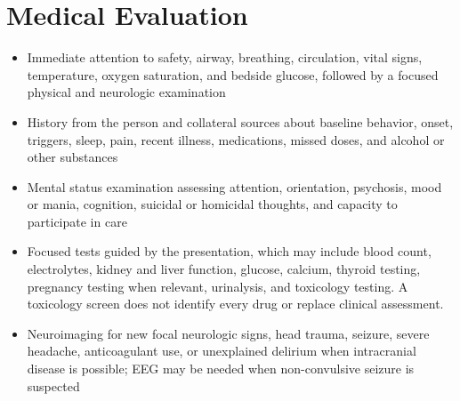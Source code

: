 \section*{Medical Evaluation}
\begin{itemize}
 \item Immediate attention to safety, airway, breathing, circulation, vital signs, temperature, oxygen saturation, and bedside glucose, followed by a focused physical and neurologic examination
 \item History from the person and collateral sources about baseline behavior, onset, triggers, sleep, pain, recent illness, medications, missed doses, and alcohol or other substances
 \item Mental status examination assessing attention, orientation, psychosis, mood or mania, cognition, suicidal or homicidal thoughts, and capacity to participate in care
 \item Focused tests guided by the presentation, which may include blood count, electrolytes, kidney and liver function, glucose, calcium, thyroid testing, pregnancy testing when relevant, urinalysis, and toxicology testing. A toxicology screen does not identify every drug or replace clinical assessment.
 \item Neuroimaging for new focal neurologic signs, head trauma, seizure, severe headache, anticoagulant use, or unexplained delirium when intracranial disease is possible; EEG may be needed when non-convulsive seizure is suspected
\end{itemize}

